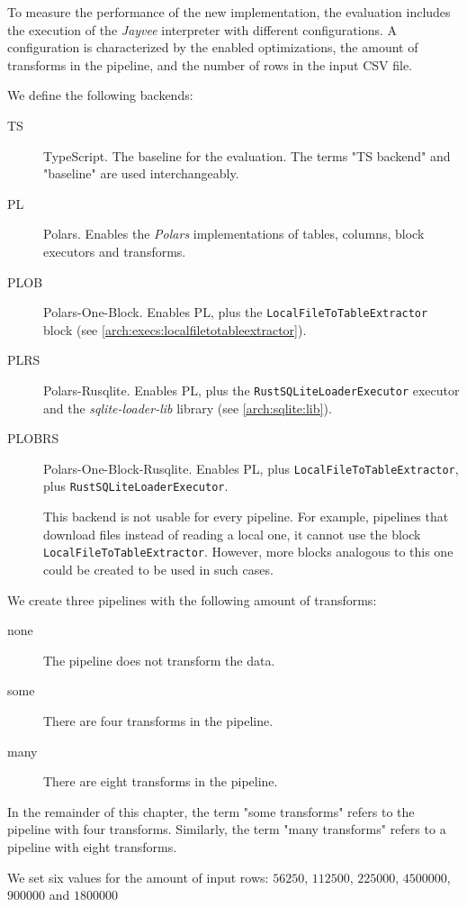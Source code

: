 To measure the performance of the new implementation, the evaluation includes the execution of the \emph{Jayvee} interpreter with different configurations.
A configuration is characterized by the enabled optimizations, the amount of transforms in the pipeline, and the number of rows in the input \ac{CSV} file.

We define the following backends:
\begin{description}
	\item[TS] TypeScript.
	      The baseline for the evaluation.
	      The terms "TS backend" and "baseline" are used interchangeably.
	\item[PL] Polars.
	      Enables the \emph{Polars} implementations of tables, columns, block executors and transforms.
	\item[PLOB] Polars-One-Block.
	      Enables PL, plus the \Verb|LocalFileToTableExtractor| block (see \autoref{arch:execs:localfiletotableextractor}).
	\item[PLRS] Polars-Rusqlite.
	      Enables PL, plus the \Verb|RustSQLiteLoaderExecutor| executor and the \emph{sqlite-loader-lib} library (see \autoref{arch:sqlite:lib}).
	\item[PLOBRS] Polars-One-Block-Rusqlite.
	      Enables PL, plus \Verb|LocalFileToTableExtractor|, plus \Verb|RustSQLiteLoaderExecutor|.

	      This backend is not usable for every pipeline.
	      For example, pipelines that download files instead of reading a local one, it cannot use the block \Verb|LocalFileToTableExtractor|.
	      However, more blocks analogous to this one could be created to be used in such cases.
\end{description}

We create three pipelines with the following amount of transforms:
\begin{description}
	\item[none] The pipeline does not transform the data.
	\item[some] There are four transforms in the pipeline.
	\item[many] There are eight transforms in the pipeline.
\end{description}

In the remainder of this chapter, the term "some transforms" refers to the pipeline with four transforms.
Similarly, the term "many transforms" refers to a pipeline with eight transforms.

We set six values for the amount of input rows:
$56250$, $112500$, $225000$, $4500000$, $900000$ and $1800000$

